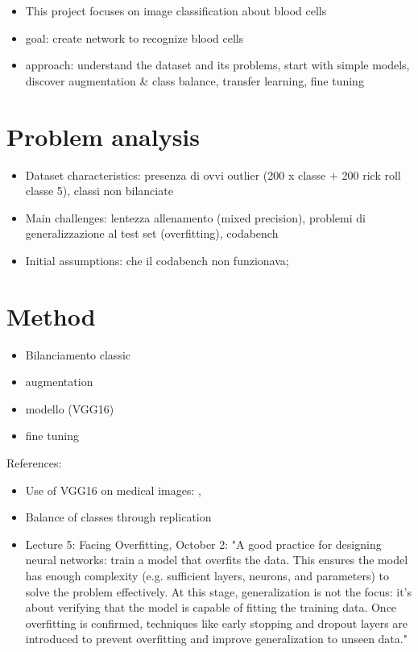 \documentclass[11pt]{article}
\begin{document}
\begin{multicols*}{2}
        \begin{itemize}
            \item This project focuses on image classification about blood cells
            \item goal: create network to recognize blood cells
            \item approach: understand the dataset and its problems, start with simple models, discover augmentation \& class balance, transfer learning, fine tuning
        \end{itemize}
    
        \section{Problem analysis} 
    
        \begin{itemize}
            \item Dataset characteristics: presenza di ovvi outlier (200 x classe + 200 rick roll classe 5), classi non bilanciate
            \item Main challenges: lentezza allenamento (mixed precision), problemi di generalizzazione al test set (overfitting), codabench
            \item Initial assumptions: che il codabench non funzionava; 
        \end{itemize}

        \section{Method} 
        \begin{itemize}
            \item Bilanciamento classic
            \item augmentation
            \item modello (VGG16)
            \item fine tuning
        \end{itemize}
        References:
        \begin{itemize}
            \item Use of VGG16 on medical images: \cite{guan2019vgg16}, \cite{acevedo2019bloodcells}
            \item Balance of classes through replication
            \item Lecture 5: Facing Overfitting, October 2: "A good practice for designing neural networks: train a model that overfits the data. This ensures the model has enough complexity (e.g. sufficient layers, neurons, and parameters) to solve the problem effectively. At this stage, generalization is not the focus: it's about verifying that the model is capable of fitting the training data. Once overfitting is confirmed, techniques like early stopping and dropout layers are introduced to prevent overfitting and improve generalization to unseen data."
        \end{itemize}

        
        
        
    
    \end{multicols*}
\end{document}

